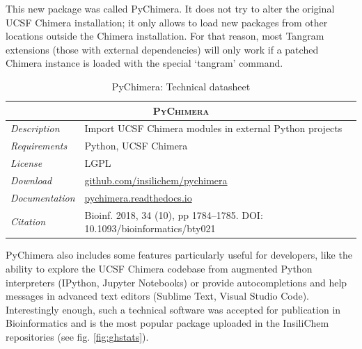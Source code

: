 This new package was called PyChimera. It does not try to alter the original UCSF Chimera installation; it only allows to load new packages from other locations outside the Chimera installation. For that reason, most Tangram extensions (those with external dependencies) will only work if a patched Chimera instance is loaded with the special ‘tangram’ command.

\begin{table}[hbtp]
	\caption{PyChimera: Technical datasheet}
	\footnotesize
	\newcommand{\tableheading}[1]{\multicolumn{2}{c}{\textsc{#1}}}
	\begin{tabularx}{\textwidth}{RL}
		\toprule
		\tableheading{PyChimera}\\
		\toprule
		\textit{Description} & Import UCSF Chimera modules in external Python projects \\
		\midrule
		\textit{Requirements} & Python, UCSF Chimera \\
		\midrule
		\textit{License} & LGPL \\
		\midrule
		\textit{Download} & \href{https://github.com/insilichem/pychimera}{github.com/insilichem/pychimera} \\
		\midrule
		\textit{Documentation} & \href{http://pychimera.readthedocs.io}{pychimera.readthedocs.io} \\
		\midrule
		\textit{Citation} & Bioinf. 2018, 34 (10), pp 1784–1785. DOI: 10.1093/bioinformatics/bty021 \\
		\bottomrule

	\end{tabularx}
\end{table}

PyChimera also includes some features particularly useful for developers, like the ability to explore the UCSF Chimera codebase from augmented Python interpreters (IPython, Jupyter Notebooks) or provide autocompletions and help messages in advanced text editors (Sublime Text, Visual Studio Code). Interestingly enough, such a technical software was accepted for publication in Bioinformatics and is the most popular package uploaded in the InsiliChem repositories (see fig. \ref{fig:ghstats}).


